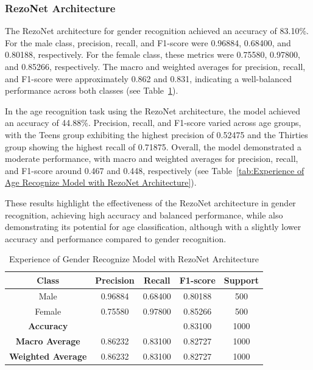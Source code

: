 \documentclass[conference, 10pt,onecolumn]{IEEEtran}
\begin{document}
\subsubsection{RezoNet Architecture}
The RezoNet architecture for gender recognition achieved an accuracy of 83.10\%. For the male class, precision, recall, and F1-score were 0.96884, 0.68400, and 0.80188, respectively. For the female class, these metrics were 0.75580, 0.97800, and 0.85266, respectively. The macro and weighted averages for precision, recall, and F1-score were approximately 0.862 and 0.831, indicating a well-balanced performance across both classes (see Table~\ref{tab:Experience of Gender Recognize Model with RezoNet Architecture}).

In the age recognition task using the RezoNet architecture, the model achieved an accuracy of 44.88\%. Precision, recall, and F1-score varied across age groups, with the Teens group exhibiting the highest precision of 0.52475 and the Thirties group showing the highest recall of 0.71875. Overall, the model demonstrated a moderate performance, with macro and weighted averages for precision, recall, and F1-score around 0.467 and 0.448, respectively (see Table~\ref{tab:Experience of Age Recognize Model with RezoNet Architecture}).

These results highlight the effectiveness of the RezoNet architecture in gender recognition, achieving high accuracy and balanced performance, while also demonstrating its potential for age classification, although with a slightly lower accuracy and performance compared to gender recognition.
\begin{table}[htbp]
    \centering
    \begin{tabular}{|c|cccc|}
        \hline
        \textbf{Class} & \textbf{Precision} & \textbf{Recall} & \textbf{F1-score} & \textbf{Support} \\
        \hline
        Male & 0.96884 & 0.68400 & 0.80188 & 500 \\
        Female & 0.75580 & 0.97800 & 0.85266 & 500 \\
        \hline
        \textbf{Accuracy} & \multicolumn{2}{c}{} & 0.83100 & 1000 \\
        \textbf{Macro Average} & 0.86232 & 0.83100 & 0.82727 & 1000 \\
        \textbf{Weighted Average} &0.86232 & 0.83100 & 0.82727  & 1000 \\
        \hline
    \end{tabular}
    \caption{Experience of Gender Recognize Model with RezoNet Architecture}
    \label{tab:Experience of Gender Recognize Model with RezoNet Architecture}
\end{table}
\end{document}
